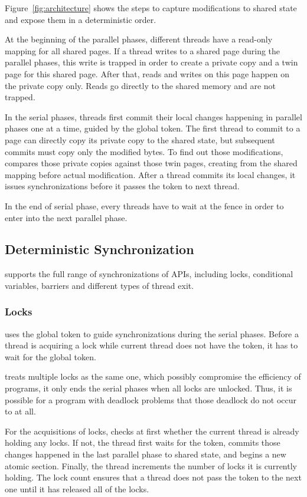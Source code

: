 Figure~\ref{fig:architecture} shows the steps to capture modifications to shared state and expose them in a deterministic order.  

At the beginning of the parallel phases, different threads have a read-only mapping for all shared pages. If a thread writes to a shared page during the parallel phases, this write is trapped in order to create a private copy and a twin page for this shared page. After that, reads and writes on this page happen on the private copy only. Reads go directly to the shared memory and are not trapped.  

In the serial phases, threads first commit their local changes happening in parallel phases one at a time, guided by the global token.  The first thread to commit to a page can directly copy its private copy to the shared state, but subsequent commits must copy only the modified bytes. To find out those modifications, \dthreads{} compares those private copies against those twin pages, creating from the shared mapping before actual modification.  After a thread commits its local changes, it issues synchronizations before it passes the token to next thread. 

In the end of serial phase, every threads have to wait at the fence in order to enter into the next parallel phase. 

\subsection{Deterministic Synchronization}
\label{sec:synchronization}
\dthreads{} supports the full range of synchronizations of
\pthreads{} APIs, including locks, conditional variables, barriers and different types of thread exit.

\subsubsection{Locks}
\dthreads{} uses the global token to guide synchronizations during the serial phases. Before a thread is acquiring a lock while current thread does not have the token, it has to wait for the global token. 

\dthreads{} treats multiple locks as the same one, which  possibly compromise the efficiency of programs, it only ends the serial phases when all locks are unlocked. Thus, it is possible for a program with deadlock problems that those deadlock do not occur to \dthreads{} at all. 

For the acquisitions of locks, \dthreads{} checks at first 
whether the current thread is already holding any locks. If not, the thread first waits for the token, commits those changes happened in the last parallel phase to shared state, and begins a new atomic section. Finally, the thread increments the number of locks it is currently holding. The lock count ensures that a thread does not pass the token to the next one until it has released all of the locks.

